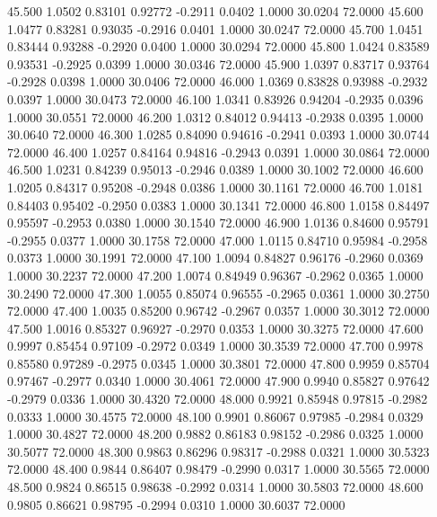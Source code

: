   45.500   1.0502   0.83101   0.92772  -0.2911   0.0402   1.0000  30.0204  72.0000
  45.600   1.0477   0.83281   0.93035  -0.2916   0.0401   1.0000  30.0247  72.0000
  45.700   1.0451   0.83444   0.93288  -0.2920   0.0400   1.0000  30.0294  72.0000
  45.800   1.0424   0.83589   0.93531  -0.2925   0.0399   1.0000  30.0346  72.0000
  45.900   1.0397   0.83717   0.93764  -0.2928   0.0398   1.0000  30.0406  72.0000
  46.000   1.0369   0.83828   0.93988  -0.2932   0.0397   1.0000  30.0473  72.0000
  46.100   1.0341   0.83926   0.94204  -0.2935   0.0396   1.0000  30.0551  72.0000
  46.200   1.0312   0.84012   0.94413  -0.2938   0.0395   1.0000  30.0640  72.0000
  46.300   1.0285   0.84090   0.94616  -0.2941   0.0393   1.0000  30.0744  72.0000
  46.400   1.0257   0.84164   0.94816  -0.2943   0.0391   1.0000  30.0864  72.0000
  46.500   1.0231   0.84239   0.95013  -0.2946   0.0389   1.0000  30.1002  72.0000
  46.600   1.0205   0.84317   0.95208  -0.2948   0.0386   1.0000  30.1161  72.0000
  46.700   1.0181   0.84403   0.95402  -0.2950   0.0383   1.0000  30.1341  72.0000
  46.800   1.0158   0.84497   0.95597  -0.2953   0.0380   1.0000  30.1540  72.0000
  46.900   1.0136   0.84600   0.95791  -0.2955   0.0377   1.0000  30.1758  72.0000
  47.000   1.0115   0.84710   0.95984  -0.2958   0.0373   1.0000  30.1991  72.0000
  47.100   1.0094   0.84827   0.96176  -0.2960   0.0369   1.0000  30.2237  72.0000
  47.200   1.0074   0.84949   0.96367  -0.2962   0.0365   1.0000  30.2490  72.0000
  47.300   1.0055   0.85074   0.96555  -0.2965   0.0361   1.0000  30.2750  72.0000
  47.400   1.0035   0.85200   0.96742  -0.2967   0.0357   1.0000  30.3012  72.0000
  47.500   1.0016   0.85327   0.96927  -0.2970   0.0353   1.0000  30.3275  72.0000
  47.600   0.9997   0.85454   0.97109  -0.2972   0.0349   1.0000  30.3539  72.0000
  47.700   0.9978   0.85580   0.97289  -0.2975   0.0345   1.0000  30.3801  72.0000
  47.800   0.9959   0.85704   0.97467  -0.2977   0.0340   1.0000  30.4061  72.0000
  47.900   0.9940   0.85827   0.97642  -0.2979   0.0336   1.0000  30.4320  72.0000
  48.000   0.9921   0.85948   0.97815  -0.2982   0.0333   1.0000  30.4575  72.0000
  48.100   0.9901   0.86067   0.97985  -0.2984   0.0329   1.0000  30.4827  72.0000
  48.200   0.9882   0.86183   0.98152  -0.2986   0.0325   1.0000  30.5077  72.0000
  48.300   0.9863   0.86296   0.98317  -0.2988   0.0321   1.0000  30.5323  72.0000
  48.400   0.9844   0.86407   0.98479  -0.2990   0.0317   1.0000  30.5565  72.0000
  48.500   0.9824   0.86515   0.98638  -0.2992   0.0314   1.0000  30.5803  72.0000
  48.600   0.9805   0.86621   0.98795  -0.2994   0.0310   1.0000  30.6037  72.0000
